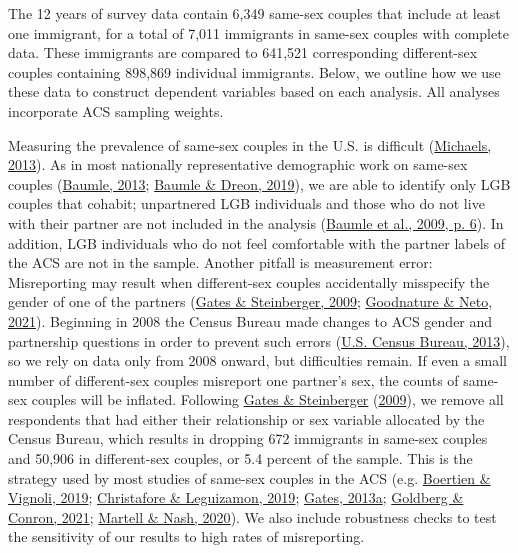 \documentclass[
  11pt,
]{article}
\begin{document}
The 12 years of survey data contain 6,349 same-sex couples that include at least one immigrant, for a total of 7,011 immigrants in same-sex couples with complete data. These immigrants are compared to 641,521 corresponding different-sex couples containing 898,869 individual immigrants. Below, we outline how we use these data to construct dependent variables based on each analysis. All analyses incorporate ACS sampling weights.

Measuring the prevalence of same-sex couples in the U.S. is difficult (\protect\hyperlink{ref-michaels_2013}{Michaels, 2013}). As in most nationally representative demographic work on same-sex couples (\protect\hyperlink{ref-baumle_2013}{Baumle, 2013}; \protect\hyperlink{ref-baumle_2019}{Baumle \& Dreon, 2019}), we are able to identify only LGB couples that cohabit; unpartnered LGB individuals and those who do not live with their partner are not included in the analysis (\protect\hyperlink{ref-baumle_2009}{Baumle et al., 2009, p. 6}). In addition, LGB individuals who do not feel comfortable with the partner labels of the ACS are not in the sample. Another pitfall is measurement error: Misreporting may result when different-sex couples accidentally misspecify the gender of one of the partners (\protect\hyperlink{ref-gates_2009}{Gates \& Steinberger, 2009}; \protect\hyperlink{ref-goodnature_2021}{Goodnature \& Neto, 2021}). Beginning in 2008 the Census Bureau made changes to ACS gender and partnership questions in order to prevent such errors (\protect\hyperlink{ref-u.s.censusbureau_2013}{U.S. Census Bureau, 2013}), so we rely on data only from 2008 onward, but difficulties remain. If even a small number of different-sex couples misreport one partner's sex, the counts of same-sex couples will be inflated. Following \protect\hyperlink{ref-gates_2009}{Gates \& Steinberger} (\protect\hyperlink{ref-gates_2009}{2009}), we remove all respondents that had either their relationship or sex variable allocated by the Census Bureau, which results in dropping 672 immigrants in same-sex couples and 50,906 in different-sex couples, or 5.4 percent of the sample. This is the strategy used by most studies of same-sex couples in the ACS (e.g. \protect\hyperlink{ref-boertien_2019}{Boertien \& Vignoli, 2019}; \protect\hyperlink{ref-christafore_2019}{Christafore \& Leguizamon, 2019}; \protect\hyperlink{ref-gates_2013}{Gates, 2013a}; \protect\hyperlink{ref-goldberg_2021}{Goldberg \& Conron, 2021}; \protect\hyperlink{ref-martell_2020}{Martell \& Nash, 2020}). We also include robustness checks to test the sensitivity of our results to high rates of misreporting.
\end{document}
